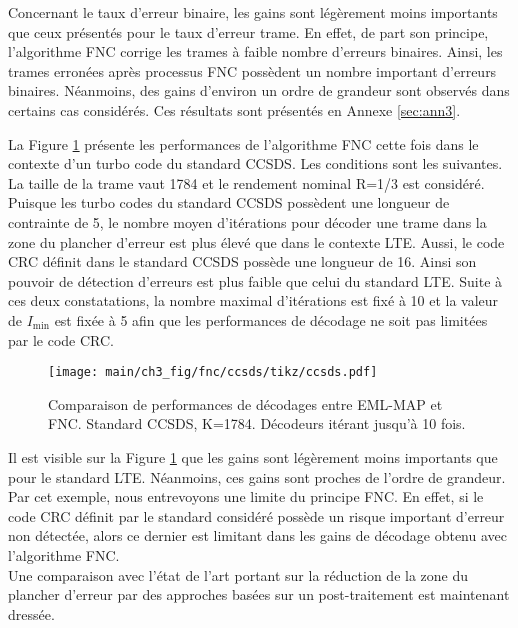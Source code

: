 Concernant le taux d'erreur binaire, les gains sont légèrement moins importants que ceux présentés pour le taux d'erreur trame. En effet,
de part son principe, l'algorithme FNC corrige les trames à faible nombre d'erreurs binaires. Ainsi, les trames erronées 
après processus FNC possèdent un nombre important d'erreurs binaires. Néanmoins, des gains d'environ un ordre de grandeur 
sont observés dans certains cas considérés. Ces résultats sont présentés en Annexe \ref{sec:ann3}.

La Figure \ref{fig:fnc_ccsds} présente les performances de l'algorithme FNC cette fois dans le contexte d'un turbo code 
du standard CCSDS. Les conditions sont les suivantes. La taille de la trame vaut 1784 et le rendement nominal R=1/3 est 
considéré. 
Puisque les turbo codes du standard CCSDS possèdent une longueur de contrainte de 5, le nombre moyen d'itérations pour 
décoder une trame dans la zone du plancher d'erreur est plus élevé que dans le contexte LTE. Aussi, le code CRC définit 
dans le standard CCSDS possède une longueur de 16. Ainsi son pouvoir de détection d'erreurs est plus faible que celui du 
standard LTE. Suite à ces deux constatations, la nombre maximal d'itérations est fixé à 10 et la valeur de $I_\text{min}$
est fixée à 5 afin que les performances de décodage ne soit pas limitées par le code CRC.

\begin{figure}[!hb]
	\centering
	\texttt{[image: main/ch3\_fig/fnc/ccsds/tikz/ccsds.pdf]}
	\caption{Comparaison de performances de décodages entre EML-MAP et FNC. Standard CCSDS, K=1784.
	Décodeurs itérant jusqu'à 10 fois. \label{fig:fnc_ccsds}}
\end{figure}

Il est visible sur la Figure \ref{fig:fnc_ccsds} que les gains sont légèrement moins importants que pour le standard LTE. 
Néanmoins, ces gains sont proches de l'ordre de grandeur.
Par cet exemple, nous entrevoyons une limite du principe FNC. En effet, si le code CRC définit par le standard considéré 
possède un risque important d'erreur non détectée, alors ce dernier est limitant dans les gains de décodage obtenu
avec l'algorithme FNC. \\
Une comparaison avec l'état de l'art portant sur la réduction de la zone du plancher d'erreur 
par des approches basées sur un post-traitement est maintenant dressée.

